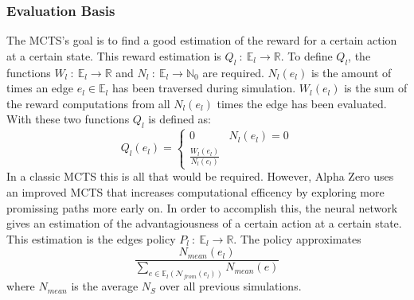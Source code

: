 \documentclass[12pt]{article}
\begin{document}
\subsubsection{Evaluation Basis}
The MCTS's goal is to find a good estimation of the reward for a certain action at a certain state. This reward estimation is \(Q_l~:~\mathbb{E}_{l}\to \mathbb{R}\). To define \(Q_l\), the functions \(W_l~:~\mathbb{E}_{l}\to\mathbb{R}\) and \(N_l~:~\mathbb{E}_{l}\to\mathbb{N}_0\) are required. \(N_l(e_l)\) is the amount of times an edge \(e_l\in\mathbb{E}_{l}\) has been traversed during simulation. \(W_l(e_l)\) is the sum of the reward computations from all \(N_l(e_l)\) times the edge has been evaluated. With these two functions \(Q_l\) is defined as:
\begin{equation}\label{eq:Ql}
Q_l(e_l) = 
\begin{cases}
0 & N_l(e_l) = 0\\
\frac{W_l(e_l)}{N_l(e_l)} &
\end{cases}
\end{equation}
In a classic MCTS this is all that would be required. However, Alpha Zero uses an improved MCTS that increases computational efficency by exploring more promissing paths more early on. In order to accomplish this, the neural network gives an estimation of the advantagiousness of a certain action at a certain state. This estimation is the edges policy \(P_l~:~\mathbb E_l \to \mathbb R\). The policy approximates
\begin{equation}
\frac{N_{mean}(e_l)}{\sum_{e\in\mathbb E_l(\mathcal N_{from}(e_l))} N_{mean}(e)}
\end{equation}
where \(N_{mean}\) is the average \(N_S\) over all previous simulations.
\end{document}
